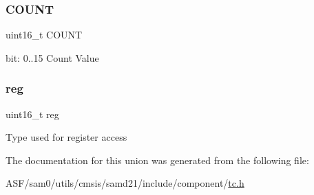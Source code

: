 \subsubsection{\texorpdfstring{COUNT}{COUNT}}
{\footnotesize\ttfamily uint16\+\_\+t C\+O\+U\+NT}

bit\+: 0..15 Count Value \mbox{\label{union_t_c___c_o_u_n_t16___c_o_u_n_t___type_a11760f5020019f4aa8cb02e694f7cc44}} 
\subsubsection{\texorpdfstring{reg}{reg}}
{\footnotesize\ttfamily uint16\+\_\+t reg}

Type used for register access 

The documentation for this union was generated from the following file\+:\begin{DoxyCompactItemize}
\item 
A\+S\+F/sam0/utils/cmsis/samd21/include/component/\mbox{\hyperlink{utils_2cmsis_2samd21_2include_2component_2tc_8h}{tc.\+h}}\end{DoxyCompactItemize}
